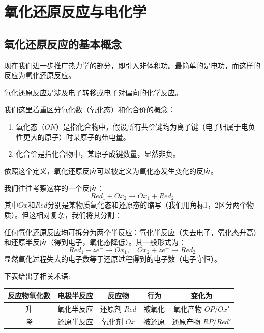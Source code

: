 \section{氧化还原反应与电化学}  
\subsection{氧化还原反应的基本概念}

现在我们进一步推广热力学的部分，即引入非体积功。最简单的是电功，而这样的反应为氧化还原反应。

\begin{definition}[氧化还原反应]
氧化还原反应是涉及电子转移或电子对偏向的化学反应。
\end{definition}

我们这里着重区分氧化数（氧化态）和化合价的概念：
\begin{definition}[氧化数和化合价]
  \begin{enumerate}
    \item 氧化态（$ON$）是指化合物中，假设所有共价键均为离子键（电子归属于电负性更大的原子）时某原子的带电量。
    \item 化合价是指化合物中，某原子成键数量，显然非负。
  \end{enumerate}
\end{definition}

依照这个定义，氧化还原反应可以被定义为氧化态发生变化的反应。

我们往往考察这样的一个反应：$$Red_1 + Ox_2  \to Ox_1 + Red_2$$其中$Ox$和$Red$分别是某物质氧化态和还原态的缩写（我们用角标1，2区分两个物质）。但这相对复杂，我们将其分割：

\begin{definition}[电极半反应]
任何氧化还原反应均可拆分为两个半反应：氧化半反应（失去电子，氧化态升高）和还原半反应（得到电子，氧化态降低）。其一般形式为：
$$Red_1- ze^- \to Ox_1 , \quad Ox_2 + ze^- \to Red_2$$
显然氧化过程失去的电子数等于还原过程得到的电子数（电子守恒）。
\end{definition}

下表给出了相关术语:

\begin{definition}[氧化还原反应相关术语]
\begin{center}
\begin{tabular}{c c c c c}
    \toprule
    反应物氧化数 & 电极半反应 & 反应物 & 行为 & 变化为 \\
    \midrule
    升 & 氧化半反应 & 还原剂 \(Red\) & 被氧化 & 氧化产物 \(OP/Ox'\) \\
    降 & 还原半反应 & 氧化剂 \(Ox\) & 被还原 & 还原产物 \(RP/Red'\) \\
    \bottomrule
\end{tabular}
\end{center}
\end{definition}

